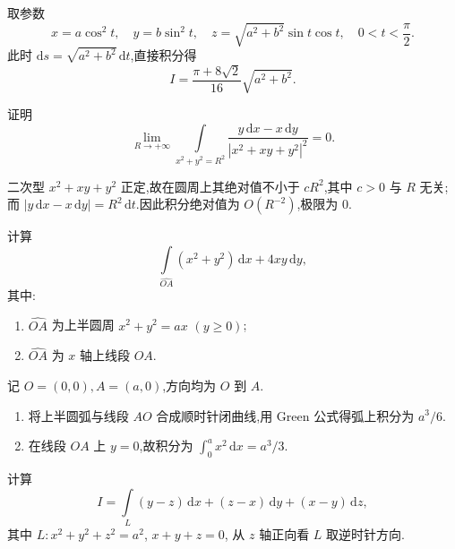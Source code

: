 \begin{solution}
    取参数
    \[
        x=a\cos^2t,\quad y=b\sin^2t,\quad z=\sqrt{a^2+b^2}\sin t\cos t,\quad 0<t<\dfrac{\pi}{2}.
    \]
    此时 $\mathrm{d}s=\sqrt{a^2+b^2}\,\mathrm{d}t$,直接积分得
    \[
        I=\dfrac{\pi+8\sqrt{2}}{16}\sqrt{a^2+b^2}.
    \]
\end{solution}

\begin{example}
    证明
    \[
        \displaystyle\lim\limits_{R\to+\infty}
        \int\limits_{x^2+y^2=R^2}
        \dfrac{y\,\mathrm{d}x-x\,\mathrm{d}y}{|x^2+xy+y^2|^2}=0.
    \]
\end{example}
\exampleblank

\begin{solution}
    二次型 $x^2+xy+y^2$ 正定,故在圆周上其绝对值不小于 $cR^2$,其中 $c>0$ 与 $R$ 无关;而 $|y\,\mathrm{d}x-x\,\mathrm{d}y|=R^2\,\mathrm{d}t$.因此积分绝对值为 $O(R^{-2})$,极限为 $0$.
\end{solution}

\begin{example}
    计算
    \[
        \displaystyle\int\limits_{\widehat{OA}}(x^2+y^2)\,\mathrm{d}x+4xy\,\mathrm{d}y,
    \]
    其中:
    \begin{enumerate}
        \item $\widehat{OA}$ 为上半圆周 $x^2+y^2=ax$ $(y\geq0)$;
        \item $\widehat{OA}$ 为 $x$ 轴上线段 $OA$.
    \end{enumerate}
\end{example}
\exampleblank

\begin{solution}
    记 $O=(0,0),A=(a,0)$,方向均为 $O$ 到 $A$.
    \begin{enumerate}
        \item 将上半圆弧与线段 $AO$ 合成顺时针闭曲线,用 Green 公式得弧上积分为 $a^3/6$.
        \item 在线段 $OA$ 上 $y=0$,故积分为 $\displaystyle\int_0^ax^2\,\mathrm{d}x=a^3/3$.
    \end{enumerate}
\end{solution}

\begin{example}
    计算
    \[
        I=\int\limits_L(y-z)\,\mathrm{d}x+(z-x)\,\mathrm{d}y+(x-y)\,\mathrm{d}z,
    \]
    其中 $L:x^2+y^2+z^2=a^2$, $x+y+z=0$, 从 $z$ 轴正向看 $L$ 取逆时针方向.
\end{example}
\exampleblank

